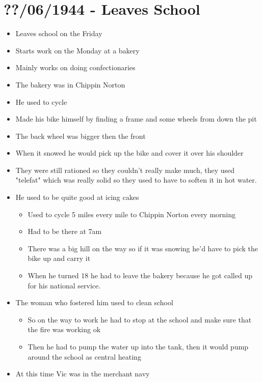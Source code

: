 \documentclass[10pt,twocolumn,letterpaper]{article}
\begin{document}
\section{??/06/1944 - Leaves School}
\begin{itemize}
    \item Leaves school on the Friday
    \item Starts work on the Monday at a bakery
    \item Mainly works on doing confectionaries
    \item The bakery was in Chippin Norton
    \item He used to cycle
    \item Made his bike himself by finding a frame and some wheels from down the pit
    \item The back wheel was bigger then the front
    \item When it snowed he would pick up the bike and cover it over his shoulder
    \item They were still rationed so they couldn't really make much, they used "telefat" which was really solid so they used to have to soften it in hot water.
    \item He used to be quite good at icing cakes
          \begin{itemize}
              \item Used to cycle 5 miles every mile to Chippin Norton every morning
              \item Had to be there at 7am
              \item There was a big hill on the way so if it was snowing he'd have to pick the bike up and carry it
              \item When he turned 18 he had to leave the bakery because he got called up for his national service.
          \end{itemize}
    \item The woman who fostered him used to clean school
          \begin{itemize}
              \item So on the way to work he had to stop at the school and make sure that the fire was working ok
              \item Then he had to pump the water up into the tank, then it would pump around the school as central heating
          \end{itemize}
    \item At this time Vic was in the merchant navy
          \begin{itemize}

\end{itemize}
\end{itemize}
\end{document}
